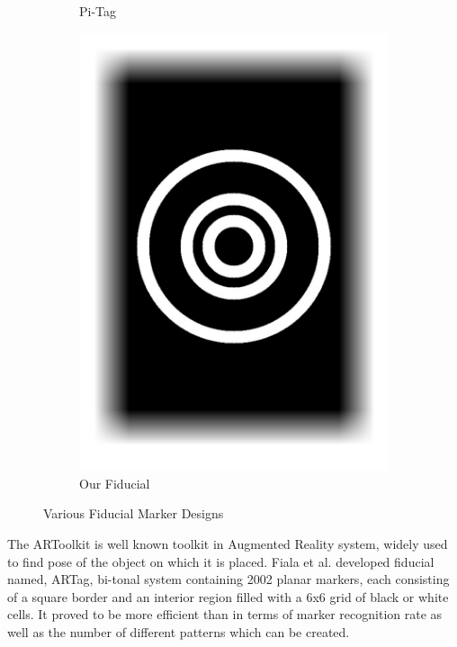 \documentclass[runningheads]{llncs}
\begin{document}
\begin{figure}
\begin{subfigure}[b]{0.19\textwidth}
  Pi-Tag\cite{Pitag13}  
 \end{subfigure}
 \begin{subfigure}[b]{0.19\textwidth}
  \centering
  \includegraphics[width=\linewidth]{newconcentric_01.pdf}  
  Our Fiducial  
 \end{subfigure}
 \caption{Various Fiducial Marker Designs}
 \label{fig:previous_work}  
\end{figure}
 
The ARToolkit \cite{ARToolkit02} \cite{kato-artoolkit} is well known toolkit in
Augmented Reality system, widely used to find pose of the object on which it is
placed.  Fiala et al. \cite{Fiala05} developed fiducial named, ARTag, bi-tonal
system containing 2002 planar markers, each consisting of a square border and
an interior region filled with a 6x6 grid of black or white cells. It proved to
be more efficient than \cite{ARToolkit02} in terms of marker recognition rate
as well as the number of different patterns which can be created.  
\end{document}
